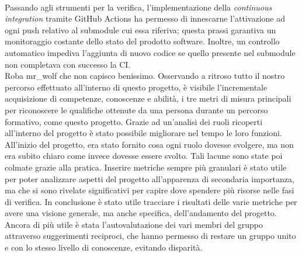 	\\Passando agli strumenti per la verifica, l'implementazione della \textit{continuous integration} tramite GitHub Actions ha permesso di innescarne l'attivazione ad ogni push relativo al submodule cui essa riferiva; questa prassi garantiva un monitoraggio costante dello stato del prodotto software. Inoltre, un controllo automatico impediva l'aggiunta di nuovo codice se quello presente nel submodule non completava con successo la CI.
	\\Roba mr\_wolf che non capisco benissimo.
	\newline\newline
	Osservando a ritroso tutto il nostro percorso effettuato all’interno di questo progetto, è visibile l’incrementale acquisizione di competenze, conoscenze e abilità, i tre metri di misura principali per riconoscere le qualifiche ottenute da una persona durante un percorso formativo, come questo progetto.
	\newline
	Grazie ad un'analisi dei ruoli ricoperti all’interno del progetto è stato possibile migliorare nel tempo le loro funzioni. All’inizio del progetto, era stato fornito cosa ogni ruolo dovesse svolgere, ma non era subito chiaro come invece dovesse essere svolto. Tali lacune sono state poi colmate grazie alla pratica.
	\newline
	Inserire metriche sempre più granulari è stato utile per poter analizzare aspetti del progetto all’apparenza di secondaria importanza, ma che si sono rivelate significativi per capire dove spendere più risorse nelle fasi di verifica.
	\newline
	In conclusione è stato utile tracciare i risultati delle varie metriche per avere una visione generale, ma anche specifica, dell’andamento del progetto. Ancora di più utile è stata l’autovalutazione dei vari membri del gruppo attraverso suggerimenti reciproci, che hanno permesso di restare un gruppo unito e con lo stesso livello di conoscenze, evitando disparità.
